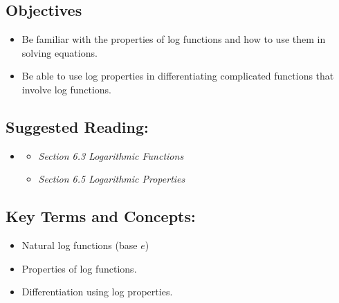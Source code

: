 
\vspace{-0.25 in}
\begin{framed}
\subsection*{Objectives}
\begin{itemize}
    \item Be familiar with the properties of log functions and how to use them in solving equations.
    \item Be able to use log properties in differentiating complicated functions that involve log functions.
\end{itemize}

\subsection*{Suggested Reading:}
\begin{itemize}
\item \cite{openstaxColAlgebra}\footnotemark[1]
    \begin{itemize}
        \item \emph{Section 6.3 Logarithmic Functions}
        \item \emph{Section 6.5 Logarithmic Properties}
    \end{itemize}
   
\end{itemize}
\subsection*{Key Terms and Concepts:} 

\begin{multicols}{2}
\begin{itemize}
    \item Natural log functions (base $e$)
    \item Properties of log functions.
    \item Differentiation using log properties.
\end{itemize}
\end{multicols}
\end{framed}

